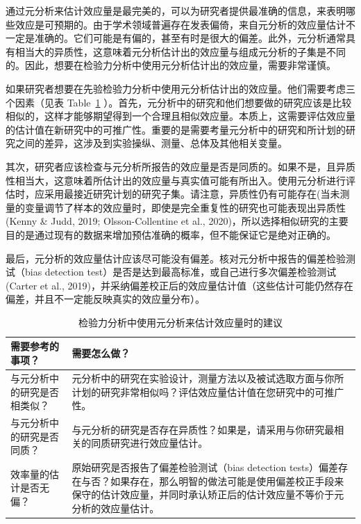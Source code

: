 \documentclass[
  letterpaper,
  DIV=11,
  numbers=noendperiod]{scrreprt}
\begin{document}
通过元分析来估计效应量是最完美的，可以为研究者提供最准确的信息，来表明哪些效应是可预期的。由于学术领域普遍存在发表偏倚，来自元分析的效应量估计不一定是准确的。它们可能是有偏的，甚至有时是很大的偏差。此外，元分析通常具有相当大的异质性，这意味着元分析估计出的效应量与组成元分析的子集是不同的。因此，想要在检验力分析中使用元分析估计出的效应量，需要非常谨慎。

如果研究者想要在先验检验力分析中使用元分析估计出的效应量。他们需要考虑三个因素（见表
Table~\ref{tbl-tablemetajust}
）。首先，元分析中的研究和他们想要做的研究应该是比较相似的，这样才能够期望得到一个合理且相似效应量。本质上，这需要评估效应量的估计值在新研究中的可推广性。重要的是需要考量元分析中的研究和所计划的研究之间的差异，这涉及到实验操纵、测量、总体及其他相关变量。

其次，研究者应该检查与元分析所报告的效应量是否是同质的。如果不是，且异质性相当大，这意味着所估计出的效应量与真实值可能有所出入。使用元分析进行评估时，应采用最接近研究计划的研究子集。请注意，异质性仍有可能存在(当未测量的变量调节了样本的效应量时，即使是完全重复性的研究也可能表现出异质性(Kenny
\& Judd, 2019; Olsson-Collentine et al.,
2020)，所以选择相似研究的主要目的是通过现有的数据来增加预估准确的概率，但不能保证它是绝对正确的。

最后，元分析的效应量估计应该尽可能没有偏差。核对元分析中报告的偏差检验测试（bias
detection test）是否是达到最高标准，或自己进行多次偏差检验测试(Carter et
al.,
2019)，并采纳偏差校正后的效应量估计值（这些估计可能仍然存在偏差，并且不一定能反映真实的效应量分布）。

\hypertarget{tbl-tablemetajust}{}
\begin{table}
\caption{\label{tbl-tablemetajust}检验力分析中使用元分析来估计效应量时的建议 }\tabularnewline

\centering
\begin{tabular}{>{\raggedright\arraybackslash}p{5cm}|>{\raggedright\arraybackslash}p{10cm}}
\hline
需要参考的事项？ & 需要怎么做？\\
\hline
与元分析中的研究是否相类似？ & 元分析中的研究在实验设计，测量方法以及被试选取方面与你所计划的研究非常相似吗？评估效应量估计值在您研究中的可推广性。\\
\hline
与元分析中的研究是否同质？ & 与元分析的研究是否存在异质性？如果是，请采用与你研究最相关的同质研究进行效应量估计。\\
\hline
效率量的估计是否无偏？ & 原始研究是否报告了偏差检验测试（bias detection tests）偏差存在与否？如果存在，那么明智的做法可能是使用偏差校正手段来保守的估计效应量，并同时承认矫正后的估计效应量不等价于元分析的效应量估计。\\
\hline
\end{tabular}
\end{table}
\end{document}
